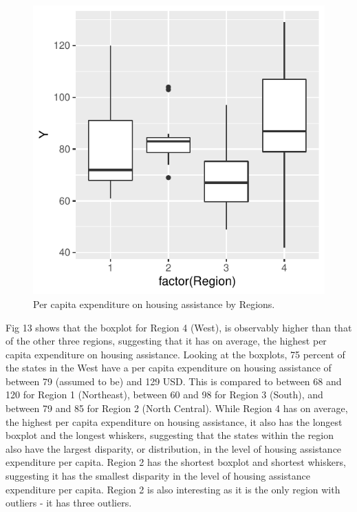 \documentclass[12pt,letterpaper]{article}
\begin{document}
\begin{itemize}
\vspace{.5cm}
  
\vspace{.5cm}

\begin{figure}[hbtp!]\centering
	\caption{\footnotesize Per capita expenditure on housing assistance by Regions.}
	\label{boxplot}
	\includegraphics[width=.75\textwidth]{Rplot_Y_Region.pdf}
\end{figure}

\noindent Fig 13 shows that the boxplot for Region 4 (West), is observably higher than that of the other three regions, suggesting that it has on average, the highest per capita expenditure on housing assistance. Looking at the boxplots, 75 percent of the states in the West have a per capita expenditure on housing assistance of between 79 (assumed to be) and 129 USD. This is compared to between 68 and 120 for Region 1 (Northeast), between 60 and 98 for Region 3 (South), and between 79 and 85 for Region 2 (North Central). While Region 4 has on average, the highest per capita expenditure on housing assistance, it also has the longest boxplot and the longest whiskers, suggesting that the states within the region also have the largest disparity, or distribution, in the level of housing assistance expenditure per capita. Region 2 has the shortest boxplot and shortest whiskers, suggesting it has the smallest disparity in the level of housing assistance expenditure per capita. Region 2 is also interesting as it is the only region with outliers - it has three outliers.\\


\end{itemize}
\end{document}
